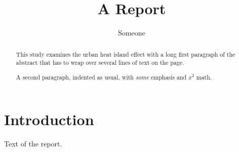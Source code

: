 \documentclass{report}
\title{A Report}
\author{Someone}
\begin{document}
\maketitle
\begin{abstract}
This study examines the urban heat island effect with a long first paragraph of the abstract that has to wrap over several lines of text on the page.

A second paragraph, indented as usual, with \emph{some} emphasis and $x^2$ math.
\end{abstract}
\chapter{Introduction}
Text of the report.
\end{document}
